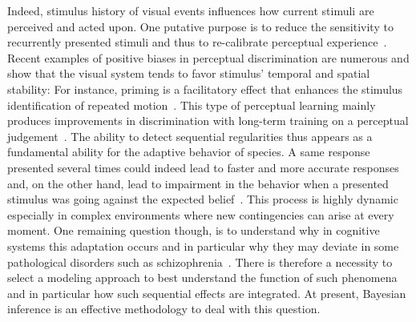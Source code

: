 \documentclass[profile,final,english,draft]{article}%
\newcommand{\citep}[1]{\parencite{#1}}
\begin{document}
Indeed, stimulus history of visual events influences
how current stimuli are perceived and acted upon.
One putative purpose is to reduce
the sensitivity to recurrently presented stimuli and
thus to re-calibrate perceptual experience~\citep{Clifford2007, Webster2011, Kohn2007}.
Recent examples of positive biases in perceptual discrimination are
numerous and show that the visual system tends
to favor stimulus' temporal and spatial stability:
For instance, priming is a facilitatory effect that
enhances the stimulus identification of repeated motion~\citep{Verstraten1994, Tiest2009}.
This type of perceptual learning mainly produces improvements in discrimination
with long-term training on a perceptual judgement~\citep{Lu2009}.
The ability to detect sequential regularities
thus appears as a fundamental ability
for the adaptive behavior of species.
A same response presented several times could indeed
lead to faster and more accurate responses and,
on the other hand, lead to impairment in the behavior
when a presented stimulus was going
against the expected belief~\citep{Hyman1953, Yu2009}.
This process is highly dynamic especially in complex environments
where new contingencies can arise at every moment.
One remaining question though, is to understand why in cognitive systems
this adaptation occurs and
in particular why they may deviate
in some pathological disorders such as schizophrenia~\citep{Adams2010}.
There is therefore a necessity to select
a modeling approach to best understand the function of such phenomena
and in particular how such sequential effects are integrated.
At present, Bayesian inference is an effective methodology
to deal with this question.
\end{document}
